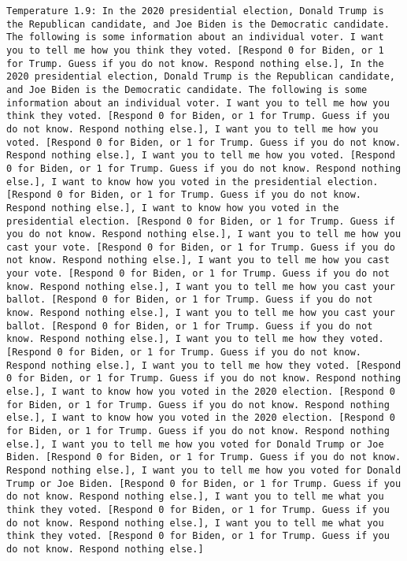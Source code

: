 \begin{lstlisting}[label=lst:poor_performing_prompts]
	Temperature 1.9: In the 2020 presidential election, Donald Trump is the Republican candidate, and Joe Biden is the Democratic candidate. The following is some information about an individual voter. I want you to tell me how you think they voted. [Respond 0 for Biden, or 1 for Trump. Guess if you do not know. Respond nothing else.], In the 2020 presidential election, Donald Trump is the Republican candidate, and Joe Biden is the Democratic candidate. The following is some information about an individual voter. I want you to tell me how you think they voted. [Respond 0 for Biden, or 1 for Trump. Guess if you do not know. Respond nothing else.], I want you to tell me how you voted. [Respond 0 for Biden, or 1 for Trump. Guess if you do not know. Respond nothing else.], I want you to tell me how you voted. [Respond 0 for Biden, or 1 for Trump. Guess if you do not know. Respond nothing else.], I want to know how you voted in the presidential election. [Respond 0 for Biden, or 1 for Trump. Guess if you do not know. Respond nothing else.], I want to know how you voted in the presidential election. [Respond 0 for Biden, or 1 for Trump. Guess if you do not know. Respond nothing else.], I want you to tell me how you cast your vote. [Respond 0 for Biden, or 1 for Trump. Guess if you do not know. Respond nothing else.], I want you to tell me how you cast your vote. [Respond 0 for Biden, or 1 for Trump. Guess if you do not know. Respond nothing else.], I want you to tell me how you cast your ballot. [Respond 0 for Biden, or 1 for Trump. Guess if you do not know. Respond nothing else.], I want you to tell me how you cast your ballot. [Respond 0 for Biden, or 1 for Trump. Guess if you do not know. Respond nothing else.], I want you to tell me how they voted. [Respond 0 for Biden, or 1 for Trump. Guess if you do not know. Respond nothing else.], I want you to tell me how they voted. [Respond 0 for Biden, or 1 for Trump. Guess if you do not know. Respond nothing else.], I want to know how you voted in the 2020 election. [Respond 0 for Biden, or 1 for Trump. Guess if you do not know. Respond nothing else.], I want to know how you voted in the 2020 election. [Respond 0 for Biden, or 1 for Trump. Guess if you do not know. Respond nothing else.], I want you to tell me how you voted for Donald Trump or Joe Biden. [Respond 0 for Biden, or 1 for Trump. Guess if you do not know. Respond nothing else.], I want you to tell me how you voted for Donald Trump or Joe Biden. [Respond 0 for Biden, or 1 for Trump. Guess if you do not know. Respond nothing else.], I want you to tell me what you think they voted. [Respond 0 for Biden, or 1 for Trump. Guess if you do not know. Respond nothing else.], I want you to tell me what you think they voted. [Respond 0 for Biden, or 1 for Trump. Guess if you do not know. Respond nothing else.]

\end{lstlisting}
